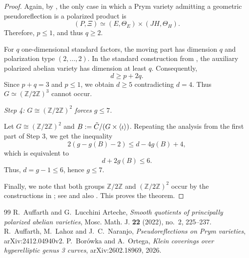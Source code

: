 \documentclass[10pt,a4paper]{amsart}
\numberwithin{equation}{section}
\newcommand{\ZZ}{\mathbb Z}
\newcommand{\tC}{\Tilde{C}}
\begin{document}
\begin{proof}
Again, by \cite[Remark 4.2]{ALN}, the only case in which a Prym variety admitting
a geometric pseudoreflection is a polarized product is $$(P,\Xi)\simeq (E,\Theta_E)\times(JH,\Theta_H).$$
Therefore, $p\leq 1$, and thus $q\geq2$.

For $q$ one-dimensional standard factors, the moving part has dimension
$q$ and polarization type $(2,\ldots,2)$. In the standard construction from \cite{ALA}, the auxiliary polarized abelian variety has dimension at least $q$. Consequently, $$d\ge p+2q.$$
Since $p+q=3$ and $p\leq 1$, we obtain
$d \geq 5$
contradicting \(d=4\). Thus \(G\simeq(\ZZ/2\ZZ)^3\) cannot occur.

\medskip
\noindent\textit{Step 4: $G \cong (\mathbb{Z}/2\mathbb{Z})^2$ forces $g \leq 7$.}

Let $G \cong (\mathbb{Z}/2\mathbb{Z})^2$ and $B := \tC / (G \times \langle\iota\rangle)$. Repeating the analysis from the first part of Step 3, we get the inequality $$2(g - g(B) - 2) \leq d - 4g(B) + 4,$$ which is equivalent to $$d+2g(B) \leq 6.$$ Thus, $d = g-1 \leq 6$, hence $g \leq 7$.

Finally, we note that both groups $\ZZ/2\ZZ$ and $(\ZZ/2\ZZ)^2$ occur by the constructions in \cite{ALN}; see \cite[Remark 5.2]{ALN} and also \cite[Remark 2.7]{BO26}. This proves the theorem.
\end{proof}


\begin{thebibliography}{99}
 R.~Auffarth and G.~Lucchini Arteche, \emph{Smooth quotients of principally polarized abelian varieties}, Mosc. Math. J. \textbf{22} (2022), no.~2, 225--237.
 R.~Auffarth, M.~Lahoz and J.~C.~Naranjo, \emph{Pseudoreflections on Prym varieties}, arXiv:2412.04940v2.
 P.~Borówka and A.~Ortega, \emph{Klein coverings over hyperelliptic genus 3 curves}, arXiv:2602.18969, 2026.
\end{thebibliography}
\end{document}
